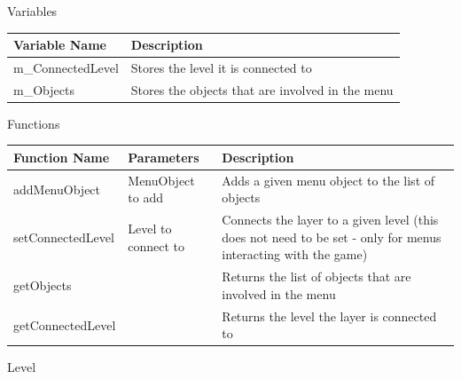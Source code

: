 \documentclass{article}
\begin{document}
                \begin{center}
                    Variables
                    \begin{tabular}{ | m{} | m{} | }
                        \hline
                        \textbf{Variable Name} & \textbf{Description} \\
                        \hline
                        m\_ConnectedLevel & Stores the level it is connected to \\
                        \hline
                        m\_Objects & Stores the objects that are involved in the menu \\
                        \hline
                    \end{tabular}
                    Functions
                    \begin{tabular}{ | m{} | m{}| m{} | }
                        \hline
                        \textbf{Function Name} & \textbf{Parameters} & \textbf{Description} \\
                        \hline
                        addMenuObject & MenuObject to add & Adds a given menu object to the list of objects \\
                        \hline
                        setConnectedLevel & Level to connect to & Connects the layer to a given level (this does not need  to be set - only for menus interacting with the game) \\
                        \hline
                        getObjects & & Returns the list of objects that are involved in the menu \\
                        \hline
                        getConnectedLevel & & Returns the level the layer is connected to \\
                        \hline
                    \end{tabular}
                \end{center}
                Level
\end{document}
